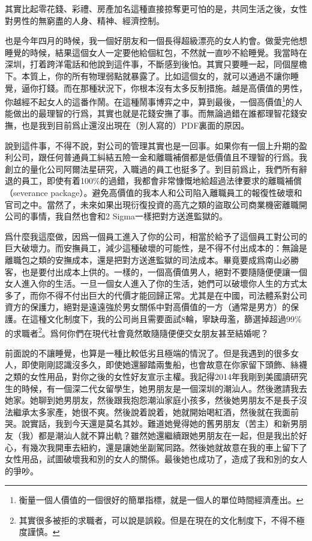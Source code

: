 其實比起零花錢、彩禮、房產加名這種直接掠奪更可怕的是，共同生活之後，女性對男性的無窮盡的人身、精神、經濟控制。

也是今年四月的時候，我一個好朋友和一個長得超級漂亮的女人約會。做愛完他想睡覺的時候，結果這個女人一定要他給個紅包，不然就一直吵不給睡覺。我當時在深圳，打着跨洋電話和他說到這件事，不斷感到後怕。其實只要睡一起，同個屋檐下。本質上，你的所有物理弱點就暴露了。比如這個女的，就可以通過不讓你睡覺，逼你打錢。而在那種狀況下，你根本沒有太多反制措施。越是高價值的男性，你越經不起女人的這番作鬧。在這種鬧事博弈之中，算到最後，一個高價值\footnote{衡量一個人價值的一個很好的簡單指標，就是一個人的單位時間經濟產出。}的人能做出的最理智的行爲，其實也就是花錢安撫了事。而無論過錯在誰都理智花錢安撫，也是我到目前爲止還沒出現在（別人寫的）PDF裏面的原因。

說到這件事，不得不說，對公司的管理其實也是一回事。如果你有一個上升期的盈利公司，跟任何普通員工糾結五險一金和離職補償都是低價值且不理智的行爲。我創立的量化公司阿爾法星研究，入職過的員工也挺多了。到目前爲止，我們所有辭退的員工，即使有着100\%的過錯，我都會非常慷慨地給超過法律要求的離職補償（severance package）。避免高價值的我本人和公司陷入離職員工的報復性破壞和官司之中。當然了，未來如果出現衍復投資的高亢之類的盜取公司商業機密離職開公司的事情，我自然也會和2 Sigma一樣把對方送進監獄的。

爲什麼我這麼做，因爲一個員工進入了你的公司，相當於給予了這個員工對公司的巨大破壞力。而安撫員工，減少這種破壞的可能性，是不得不付出成本的：無論是離職包之類的安撫成本，還是把對方送進監獄的司法成本。畢竟要成爲南山必勝客，也是要付出成本上供的。一樣的，一個高價值男人，絕對不要隨隨便便讓一個女人進入你的生活。一旦一個女人進入了你的生活，她們可以破壞你人生的方式太多了，而你不得不付出巨大的代價才能回歸正常。尤其是在中國，司法體系對公司資方的保護力，絕對是遠遠強於男女關係中對高價值的一方（通常是男方）的保護。在這種文化制度下，我的公司尚且需要面試8輪，寧缺毋濫，篩選掉超過99\%的求職者\footnote{其實很多被拒的求職者，可以說是誤殺。但是在現在的文化制度下，不得不極度謹慎。}。爲何你們在現代社會竟然敢隨隨便便交女朋友甚至結婚呢？

前面說的不讓睡覺，也算是一種比較低劣且極端的情況了。但是我遇到的很多女人，即使剛剛認識沒多久，即使她還腳踏兩隻船，也會故意在你家留下頭飾、絲襪之類的女性用品，對你之後的女性好友宣示主權。我記得2014年我剛到美國讀研究生的時候，有一個深二代女留學生，她男朋友是一個深圳的潮汕人。然後邀請我去她家。她聊到她男朋友，然後跟我抱怨潮汕家庭小孩多，然後她男朋友不是長子沒法繼承太多家產，她很不爽。然後說着說着，她就開始喝紅酒，然後就在我面前哭。說實話，我到今天還是莫名其妙。難道她覺得她的舊男朋友（苦主）和新男朋友（我）都是潮汕人就不算出軌？雖然她還繼續跟她男朋友在一起，但是我出於好心，有幾次我開車去紐約，還是讓她坐副駕同路。然後她就故意在我的車上留下了女性用品，試圖破壞我和別的女人的關係。最後她也成功了，造成了我和別的女人的爭吵。

